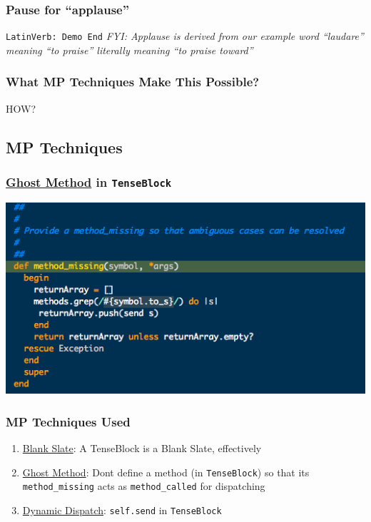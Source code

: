 \documentclass[slidestop,compress,mathserif]{beamer}
\begin{document}
\begin{frame}
	\frametitle{Pause for ``applause''}
	\begin{center}
		\texttt{LatinVerb:  Demo End}
		\vskip 0.5cm
		\emph{FYI:  Applause is derived from our example word ``laudare'' meaning ``to praise'' literally meaning ``to praise toward''}
	\end{center}	
\end{frame}

\begin{frame}
	\frametitle{What MP Techniques Make This Possible?}
	\begin{center}
		HOW?
	\end{center}
	
\end{frame}


\subsection{MP Techniques} %
\label{sub:methods}

\begin{frame}
	\frametitle{\underline{Ghost Method} in \texttt{TenseBlock}}
	\includegraphics[scale=0.45]{img/tenseblock_mm.png}
\end{frame}

\begin{frame}
	\frametitle{MP Techniques Used}
	\begin{enumerate}
		\item \underline{Blank Slate}:  A TenseBlock is a Blank Slate, effectively
		\item \underline{Ghost Method}:  Dont define a method (in \texttt{TenseBlock}) so that its \texttt{method\_missing} acts as \texttt{method\_called} for dispatching
		\item \underline{Dynamic Dispatch}:  \texttt{self.send} in \texttt{TenseBlock}
	\end{enumerate}
\end{frame}
\end{document}
